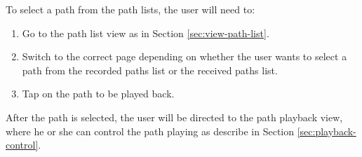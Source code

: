 \documentclass[12pt,a4paper]{article}
\begin{document}
                To select a path from the path lists, the user will need to:
                \begin{enumerate}
                    \item Go to the path list view as in Section \ref{sec:view-path-list}.
                    \item Switch to the correct page depending on whether the user wants to select a path from the recorded paths list or the received paths list.
                    \item Tap on the path to be played back.
                \end{enumerate}
                
                After the path is selected, the user will be directed to the path playback view, where he or she can control the path playing as describe in Section \ref{sec:playback-control}.
                
\end{document}

